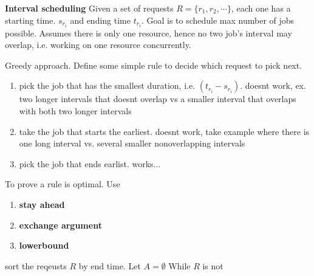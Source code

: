 \documentclass[11pt]{article}
\begin{document}
\begin{example}
  \textbf{Interval scheduling} Given a set of requests $R = \{ r_1, r_2, \cdots \}$, each one has a starting time. $s_{r_i}$ and ending time $t_{r_i}$. Goal is to schedule max number of jobs possible. Assumes there is only one resource, hence no two job's interval may overlap, i.e. working on one resource concurrently.
  \begin{approach}
    Greedy approach. Define some simple rule to decide which request to pick next.
    \begin{enumerate}
      \item pick the job that has the smallest duration, i.e. $(t_{r_i} - s_{r_i})$. doesnt work, ex. two longer intervals that doesnt overlap vs a smaller interval that overlaps with both two longer intervals
      \item take the job that starts the earliest. doesnt work, take example where there is one long interval vs. several smaller nonoverlapping intervals
      \item pick the job that ends earlist. works...
    \end{enumerate}
    To prove a rule is optimal. Use
    \begin{enumerate}
      \item \textbf{stay ahead}
      \item \textbf{exchange argument}
      \item \textbf{lowerbound}
    \end{enumerate}
  \end{approach}
  \begin{solution}
    sort the reqeusts $R$ by end time. Let $A = \emptyset$ While $R$ is not


\end{solution}
\end{example}
\end{document}

